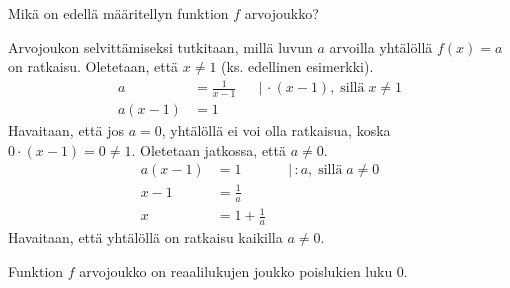 \begin{esimerkki}
	Mikä on edellä määritellyn funktion $f$ arvojoukko?
	\begin{esimratk}
		Arvojoukon selvittämiseksi tutkitaan, millä luvun $a$ arvoilla
		yhtälöllä $f(x) = a$ on ratkaisu. Oletetaan, että $x \neq 1$ (ks. edellinen esimerkki).
		\begin{align*}
			a &= \frac{1}{x-1} & &| \, \cdot (x-1), \; \text{sillä} \; x \neq 1 \\
			a(x-1) &= 1
		\end{align*}
		Havaitaan, että jos $a = 0$, yhtälöllä ei voi olla ratkaisua, koska $0 \cdot (x-1) = 0 \neq 1$.
		Oletetaan jatkossa, että $a \neq 0$.
		\begin{align*}
			a(x-1) &= 1 & &| \, : a, \; \text{sillä} \; a \neq 0 \\
			x-1 &= \frac{1}{a} \\
			x &= 1+\frac{1}{a}
		\end{align*}
		Havaitaan, että yhtälöllä on ratkaisu kaikilla $a \neq 0$.
	\end{esimratk}
	\begin{esimvast}
		Funktion $f$ arvojoukko on reaalilukujen joukko poislukien luku $0$.
	\end{esimvast}
\end{esimerkki}
